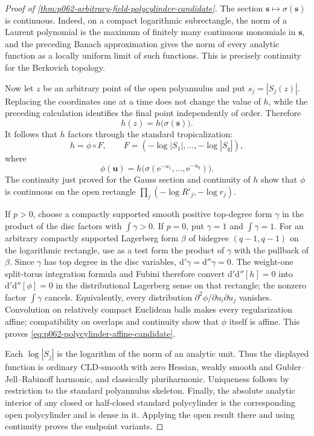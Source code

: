 \begin{proof}[Proof of \cref{thm:p062-arbitrary-field-polycylinder-candidate}]
The section \(\mathbf s\mapsto\sigma(\mathbf s)\) is continuous. Indeed,
on a compact logarithmic subrectangle, the norm of a Laurent polynomial is
the maximum of finitely many continuous monomials in \(\mathbf s\), and
the preceding Banach approximation gives the norm of every analytic
function as a locally uniform limit of such functions. This is precisely
continuity for the Berkovich topology.

Now let \(z\) be an arbitrary point of the open polyannulus and put
\(s_j=|S_j(z)|\). Replacing the coordinates one at a time does not change
the value of \(h\), while the preceding calculation identifies the final
point independently of order. Therefore
\[
                     h(z)=h\bigl(\sigma(\mathbf s)\bigr).
\]
It follows that \(h\) factors through the standard tropicalization:
\begin{equation}\label{eq:p062-polycylinder-factor-candidate}
 h=\phi\circ F,
 \qquad
 F=(-\log|S_1|,\ldots,-\log|S_q|),
\end{equation}
where
\[
             \phi(\mathbf u)
                =h\bigl(\sigma(\mathrm e^{-u_1},\ldots,
                                      \mathrm e^{-u_q})\bigr).
\]
The continuity just proved for the Gauss section and continuity of \(h\)
show that \(\phi\) is continuous on the open rectangle
\(
 \prod_j(-\log R'_j,-\log r_j).
\)

If \(p>0\), choose a compactly supported smooth positive top-degree form
\(\gamma\) in the product of the disc factors with
\(\int\gamma>0\). If \(p=0\), put \(\gamma=1\) and
\(\int\gamma=1\). For an arbitrary compactly supported Lagerberg form
\(\beta\) of bidegree \((q-1,q-1)\) on the logarithmic rectangle, use as
a test form the product of \(\gamma\) with the pullback of \(\beta\).
Since \(\gamma\) has top degree in the disc variables,
\(\mathrm d'\gamma=\mathrm d''\gamma=0\). The weight-one split-torus
integration formula and Fubini therefore convert
\(
 \mathrm d'\mathrm d''[h]=0
\)
into
\(
 \mathrm d'\mathrm d''[\phi]=0
\)
in the distributional Lagerberg sense on that rectangle; the nonzero
factor \(\int\gamma\) cancels. Equivalently,
every distribution
\(
 \partial^2\phi/\partial u_i\partial u_j
\)
vanishes. Convolution on relatively compact Euclidean balls makes every
regularization affine; compatibility on overlaps and continuity show that
\(\phi\) itself is affine. This proves
\eqref{eq:p062-polycylinder-affine-candidate}.

Each \(\log|S_j|\) is the logarithm of the norm of an analytic unit.
Thus the displayed function is ordinary CLD-smooth with zero Hessian,
weakly smooth and Gubler--Jell--Rabinoff harmonic, and classically
pluriharmonic. Uniqueness follows by restriction to the standard
polyannulus skeleton. Finally, the absolute analytic interior of any
closed or half-closed standard polycylinder is the corresponding open
polycylinder and is dense in it. Applying the open result there and using
continuity proves the endpoint variants.
\end{proof}
